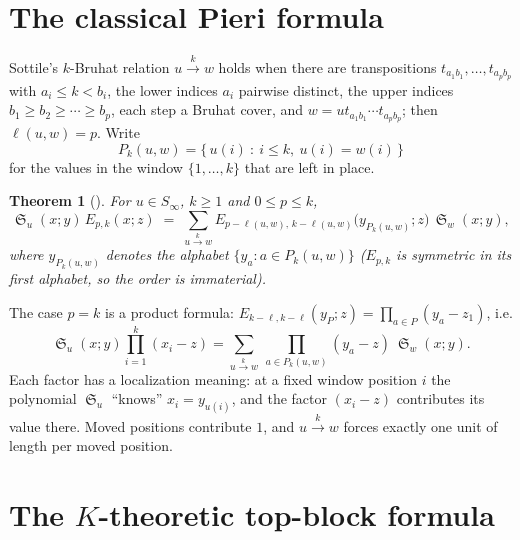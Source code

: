 \documentclass{amsart}
\newtheorem{theorem}{Theorem}[section]
\theoremstyle{definition}
\theoremstyle{remark}
\DeclareMathOperator{\sch}{\mathfrak{S}}
\newcommand{\tom}[1]{\ensuremath{\xrightarrow{#1}}}
\begin{document}
\section{The classical Pieri formula}

Sottile's $k$-Bruhat relation $u\tom{k} w$ holds when there are transpositions
$t_{a_1b_1},\dots,t_{a_pb_p}$ with $a_i\le k<b_i$, the lower indices $a_i$ pairwise distinct,
the upper indices $b_1\ge b_2\ge\cdots\ge b_p$, each step a Bruhat cover, and
$w = u t_{a_1b_1}\cdots t_{a_pb_p}$; then $\ell(u,w)=p$. Write
\[
P_k(u,w) = \{\,u(i)\ :\ i\le k,\ u(i)=w(i)\,\}
\]
for the values in the window $\{1,\dots,k\}$ that are left in place.

\begin{theorem}[{\cite[Theorem~7.1]{samuelmolev}}]\label{thm:pieri}
For $u\in S_\infty$, $k\ge1$ and $0\le p\le k$,
\[
\sch_u(x;y)\,E_{p,k}(x;z) \;=\; \sum_{u\tom{k} w} E_{p-\ell(u,w),\,k-\ell(u,w)}\bigl(y_{P_k(u,w)};z\bigr)\,\sch_w(x;y),
\]
where $y_{P_k(u,w)}$ denotes the alphabet $\{y_a : a\in P_k(u,w)\}$ ($E_{p,k}$ is symmetric in its
first alphabet, so the order is immaterial).
\end{theorem}

The case $p=k$ is a product formula: $E_{k-\ell,k-\ell}(y_P;z) = \prod_{a\in P}(y_a - z_1)$, i.e.
\begin{equation}\label{eq:pieri-top}
\sch_u(x;y)\prod_{i=1}^{k}(x_i - z) = \sum_{u\tom{k} w}\ \prod_{a\in P_k(u,w)}(y_a - z)\ \sch_w(x;y).
\end{equation}
Each factor has a localization meaning: at a fixed window position $i$ the polynomial $\sch_u$
``knows'' $x_i = y_{u(i)}$, and the factor $(x_i - z)$ contributes its value there. Moved
positions contribute $1$, and $u\tom{k}w$ forces exactly one unit of length per moved position.

\section{The $K$-theoretic top-block formula}
\end{document}
